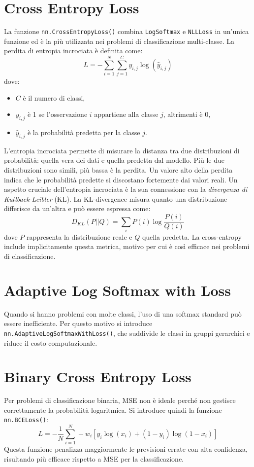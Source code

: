 \section{Cross Entropy Loss}
La funzione \texttt{nn.CrossEntropyLoss()} combina \texttt{LogSoftmax} e \texttt{NLLLoss} in un'unica funzione ed è la più utilizzata nei problemi di classificazione multi-classe. La perdita di entropia incrociata è definita come:
\begin{equation}
L = - \sum_{i=1}^{N} \sum_{j=1}^{C} y_{i,j} \log(\hat{y}_{i,j})
\end{equation}
dove:
\begin{itemize}
    \item $C$ è il numero di classi,
    \item $y_{i,j}$ è 1 se l'osservazione $i$ appartiene alla classe $j$, altrimenti è 0,
    \item $\hat{y}_{i,j}$ è la probabilità predetta per la classe $j$.
\end{itemize}
L'entropia incrociata permette di misurare la distanza tra due distribuzioni di probabilità: quella vera dei dati e quella predetta dal modello. Più le due distribuzioni sono simili, più bassa è la perdita. Un valore alto della perdita indica che le probabilità predette si discostano fortemente dai valori reali. Un aspetto cruciale dell'entropia incrociata è la sua connessione con la \textit{divergenza di Kullback-Leibler} (KL). La KL-divergence misura quanto una distribuzione differisce da un'altra e può essere espressa come:
\begin{equation}
D_{KL}(P||Q) = \sum_{i} P(i) \log \frac{P(i)}{Q(i)}
\end{equation}
dove $P$ rappresenta la distribuzione reale e $Q$ quella predetta. La cross-entropy include implicitamente questa metrica, motivo per cui è così efficace nei problemi di classificazione.

\section{Adaptive Log Softmax with Loss}
Quando si hanno problemi con molte classi, l'uso di una softmax standard può essere inefficiente. Per questo motivo si introduce \texttt{nn.AdaptiveLogSoftmaxWithLoss()}, che suddivide le classi in gruppi gerarchici e riduce il costo computazionale.

\section{Binary Cross Entropy Loss}
Per problemi di classificazione binaria, MSE non è ideale perché non gestisce correttamente la probabilità logaritmica. Si introduce quindi la funzione \texttt{nn.BCELoss()}:
\begin{equation}
L = - \frac{1}{N} \sum_{i=1}^{N} -w_i\left[y_i \log({x}_i) + (1 - y_i) \log(1 - x_i) \right]
\end{equation}
Questa funzione penalizza maggiormente le previsioni errate con alta confidenza, risultando più efficace rispetto a MSE per la classificazione.

